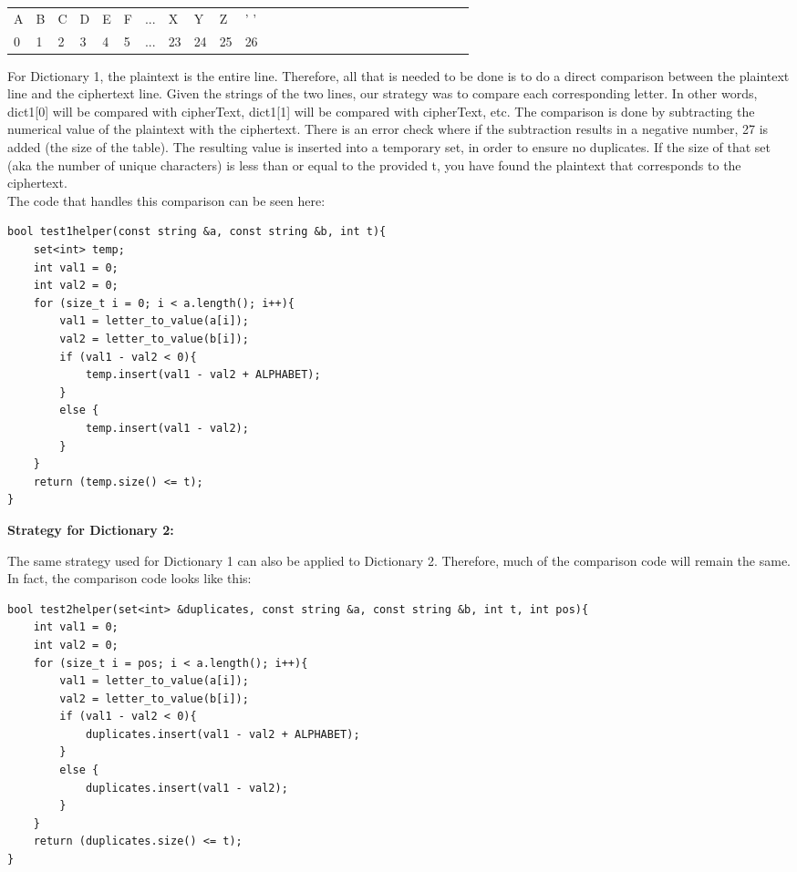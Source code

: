 \documentclass[a4paper,twoside,10pt]{report}
\begin{document}
\begin{table}[h]
\begin{tabular}{lllllllllllllllllllllllllll}
A & B & C & D & E & F & ... &  X  & Y  & Z  & ' ' \\
0 & 1 & 2 & 3 & 4 & 5 & ... &  23 & 24 & 25 & 26
\end{tabular}
\end{table}
For Dictionary 1, the plaintext is the entire line. Therefore, all that is needed to be done is to do a direct comparison between the plaintext line and the ciphertext line. Given the strings of the two lines, our strategy was to compare each corresponding letter. In other words, dict1[0] will be compared with cipherText, dict1[1] will be compared with cipherText, etc. The comparison is done by subtracting the numerical value of the plaintext with the ciphertext. There is an error check where if the subtraction results in a negative number, 27 is added (the size of the table). The resulting value is inserted into a temporary set, in order to ensure no duplicates. If the size of that set (aka the number of unique characters) is less than or equal to the provided t, you have found the plaintext that corresponds to the ciphertext. \\

\noindent
The code that handles this comparison can be seen here:

\begin{lstlisting}
bool test1helper(const string &a, const string &b, int t){
	set<int> temp;
	int val1 = 0;
	int val2 = 0;
	for (size_t i = 0; i < a.length(); i++){
		val1 = letter_to_value(a[i]);
		val2 = letter_to_value(b[i]);
		if (val1 - val2 < 0){
			temp.insert(val1 - val2 + ALPHABET);
		}
		else {
			temp.insert(val1 - val2);
		}
	}
	return (temp.size() <= t);
}
\end{lstlisting}

\vspace{5mm}
\noindent
\textbf{Strategy for Dictionary 2:}
\vspace{3mm}

The same strategy used for Dictionary 1 can also be applied to Dictionary 2. Therefore, much of the comparison code will remain the same. In fact, the comparison code looks like this:
\begin{lstlisting}
bool test2helper(set<int> &duplicates, const string &a, const string &b, int t, int pos){
	int val1 = 0;
	int val2 = 0;
	for (size_t i = pos; i < a.length(); i++){
		val1 = letter_to_value(a[i]);
		val2 = letter_to_value(b[i]);
		if (val1 - val2 < 0){
			duplicates.insert(val1 - val2 + ALPHABET);
		}
		else {
			duplicates.insert(val1 - val2);
		}
	}
	return (duplicates.size() <= t);
}
\end{lstlisting}
\vspace{5mm}
\end{document}
